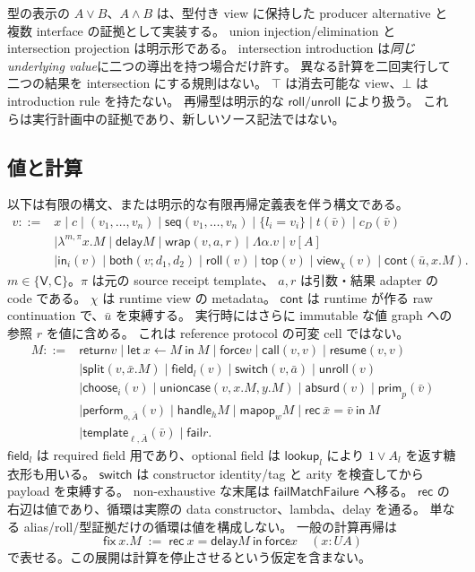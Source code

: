 \documentclass[11pt,a4paper]{article}
\newcommand{\Ret}{\mathsf{return}}
\newcommand{\Fail}{\mathsf{fail}}
\newcommand{\Force}{\mathsf{force}}
\newcommand{\Call}{\mathsf{call}}
\newcommand{\Resume}{\mathsf{resume}}
\newcommand{\Delay}{\mathsf{delay}}
\newcommand{\Handle}{\mathsf{handle}}
\newcommand{\View}{\mathsf{view}}
\begin{document}
型の表示の \(A\vee B\)、\(A\wedge B\) は、型付き view に保持した
producer alternative と複数 interface の証拠として実装する。
union injection/elimination と intersection projection は明示形である。
intersection introduction は\emph{同じ underlying value}に二つの導出を持つ場合だけ許す。
異なる計算を二回実行して二つの結果を intersection にする規則はない。
\(\top\) は消去可能な view、\(\bot\) は introduction rule を持たない。
再帰型は明示的な \(\mathsf{roll}/\mathsf{unroll}\) により扱う。
これらは実行計画中の証拠であり、新しいソース記法ではない。

\subsection{値と計算}

以下は有限の構文、または明示的な有限再帰定義表を伴う構文である。
\[
\begin{split}
v::={}&x\mid c\mid(v_1,\ldots,v_n)\mid\mathsf{seq}(v_1,\ldots,v_n)\mid\{l_i=v_i\}
 \mid t(\bar v)\mid c_D(\bar v)\\
 &\mid\lambda^{m,\pi}x.M\mid\Delay M
 \mid\mathsf{wrap}(v,a,r)\mid\Lambda\alpha.v\mid v[A]\\
 &\mid\mathsf{in}_i(v)\mid\mathsf{both}(v;d_1,d_2)
 \mid\mathsf{roll}(v)\mid\mathsf{top}(v)\mid\View_\chi(v)
 \mid\mathsf{cont}(\bar u,x.M).
\end{split}
\]
\(m\in\{\mathsf V,\mathsf C\}\)。\(\pi\) は元の source receipt template、
\(a,r\) は引数・結果 adapter の code である。
\(\chi\) は runtime view の metadata。
\(\mathsf{cont}\) は runtime が作る raw continuation で、\(\bar u\) を束縛する。
実行時にはさらに immutable な値 graph への参照 \(r\) を値に含める。
これは reference protocol の可変 cell ではない。
\[
\begin{split}
M::={}&\Ret v\mid\mathsf{let}\ x\leftarrow M\ \mathsf{in}\ M
 \mid\Force v\mid\Call(v,v)\mid\Resume(v,v)\\
 &\mid\mathsf{split}(v,\bar x.M)\mid\mathsf{field}_{l}(v)
 \mid\mathsf{switch}(v,\bar a)\mid\mathsf{unroll}(v)\\
 &\mid\mathsf{choose}_i(v)\mid\mathsf{unioncase}(v,x.M,y.M)
 \mid\mathsf{absurd}(v)\mid\mathsf{prim}_p(\bar v)\\
 &\mid\mathsf{perform}_{o,\bar A}(v)
 \mid\Handle_h M\mid\mathsf{mapop}_{w}M
 \mid\mathsf{rec}\ \bar x=\bar v\ \mathsf{in}\ M\\
 &\mid\mathsf{template}_{\ell,\bar A}(\bar v)\mid\Fail r.
\end{split}
\]
\(\mathsf{field}_l\) は required field 用であり、optional field は
\(\mathsf{lookup}_l\) により \(1\vee A_l\) を返す糖衣形も用いる。
\(\mathsf{switch}\) は constructor identity/tag と arity を検査してから payload を束縛する。
non-exhaustive な末尾は \(\Fail\mathsf{MatchFailure}\) へ移る。
\(\mathsf{rec}\) の右辺は値であり、循環は実際の data constructor、lambda、delay を通る。
単なる alias/roll/型証拠だけの循環は値を構成しない。
一般の計算再帰は
\[
 \mathsf{fix}\ x.M\;:=\;
 \mathsf{rec}\ x=\Delay M\ \mathsf{in}\ \Force x
 \quad(x:UA)
\]
で表せる。この展開は計算を停止させるという仮定を含まない。
\end{document}

